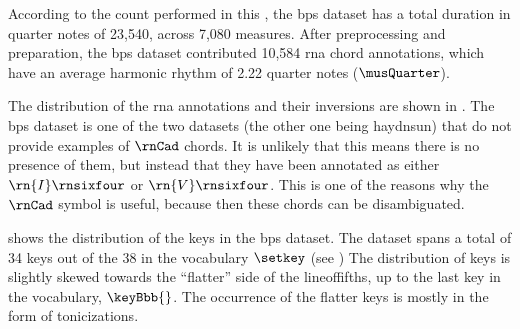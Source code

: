 
According to the count performed in this \thesisdiss{}, the
\gls{bps} dataset has a total duration in quarter notes of
23,540, across 7,080 measures. After preprocessing and
preparation, the \gls{bps} dataset contributed 10,584
\gls{rna} chord annotations, which have an average harmonic
rhythm of 2.22 quarter notes ($\musQuarter$).

The distribution of the \gls{rna} annotations and their
inversions are shown in . The
\gls{bps} dataset is one of the two datasets (the other one
being \gls{haydnsun}) that do not provide examples of
$\rnCad$ chords. It is unlikely that this means there is no
presence of them, but instead that they have been annotated
as either $\rn{I}\rnsixfour$ or $\rn{V}\rnsixfour$. This is
one of the reasons why the $\rnCad$ symbol is useful,
because then these chords can be disambiguated.



 shows the distribution of the keys
in the \gls{bps} dataset. The dataset spans a total of 34
keys out of the 38 in the vocabulary $\setkey$ (see
) The distribution of
keys is slightly skewed towards the ``flatter'' side of the
\gls{lineoffifths}, up to the last key in the vocabulary,
$\keyBbb{}$. The occurrence of the flatter keys is mostly in
the form of tonicizations. 
